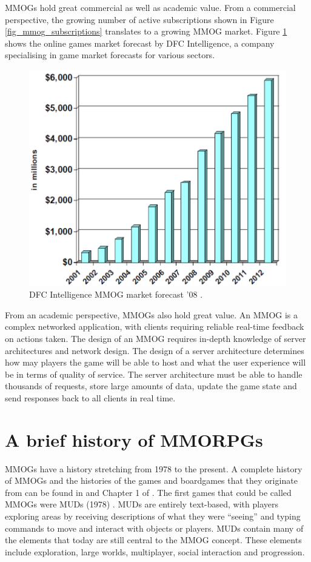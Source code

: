 \documentclass[journal,oneside,a4paper,onecolumn]{IEEEtran}
\begin{document}
\acp{MMOG} hold great commercial as well as academic value. From a commercial perspective, the growing number of active subscriptions shown in Figure \ref{fig_mmog_subscriptions} translates to a growing \ac{MMOG} market. Figure \ref{fig_mmog_market} shows the online games market forecast by DFC Intelligence, a company specialising in game market forecasts for various sectors.
%
\begin{figure}[htbp]
 \centering
 \includegraphics[width=0.4\columnwidth]{DFC_MMOG_market}
 \caption{DFC Intelligence MMOG market forecast '08 \cite{Fan_phd}.}
 \label{fig_mmog_market}
\end{figure}

From an academic perspective, \acp{MMOG} also hold great value. An MMOG is a complex networked application, with clients requiring reliable real-time feedback on actions taken. The design of an MMOG requires in-depth knowledge of server architectures and network design. The design of a server architecture determines how may players the game will be able to host and what the user experience will be in terms of quality of service. The server architecture must be able to handle thousands of requests, store large amounts of data, update the game state and send responses back to all clients in real time.


\section{A brief history of MMORPGs}

\acp{MMOG} have a history stretching from 1978 to the present. A complete history of \acp{MMOG} and the histories of the games and boardgames that they originate from can be found in \cite{mmog_past_present_future} and Chapter 1 of \cite{designing_virtual_worlds}. The first games that could be called \acp{MMOG} were \acp{MUD} (1978) \cite{mud_intro}. \acp{MUD} are entirely text-based, with players exploring areas by receiving descriptions of what they were ``seeing'' and typing commands to move and interact with objects or players. \acp{MUD} contain many of the elements that today are still central to the \ac{MMOG} concept. These elements include exploration, large worlds, multiplayer, social interaction and progression.
\end{document}
